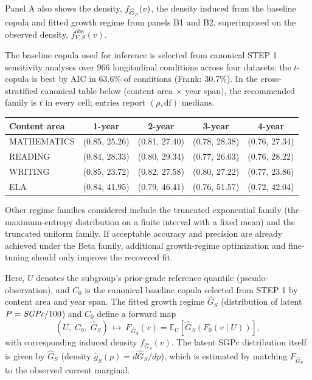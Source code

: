 \documentclass[10pt]{article}
\newlength{\fnlabelwidth}
\newcommand{\fnline}[2]{%
  \par\noindent
  \makebox[\fnlabelwidth][l]{$^{#1}$}%
  \parbox[t]{\dimexpr\linewidth-\fnlabelwidth\relax}{#2}%
  \par
}
\begin{document}
\vspace{0.60in}

\noindent
\hspace{0.5in}%
\begin{minipage}[t]{15.2in}
\small\raggedright
\setlength{\parskip}{0pt}

\fnline{1}{Panel A also shows the density, $f_{\widehat{G}_S}(v)$, the density induced from the baseline copula and fitted growth regime from panels B1 and B2, superimposed on the observed density, $f^{\mathrm{obs}}_{V,S}(v)$.}

\vspace{4pt}
\fnline{2}{The baseline copula used for inference is selected from canonical STEP 1 sensitivity analyses over 966 longitudinal conditions across four datasets: the $t$-copula is best by AIC in 63.6\% of conditions (Frank: 30.7\%). In the cross-stratified canonical table below (content area $\times$ year span), the recommended family is $t$ in every cell; entries report $(\rho,\mathrm{df})$ medians.
\vspace{2pt}
\begin{center}
\begin{tabular}{@{}lcccc@{}}
\textbf{Content area} & \textbf{1-year} & \textbf{2-year} & \textbf{3-year} & \textbf{4-year} \\
\hline
\noalign{\vspace{2pt}}
MATHEMATICS & (0.85, 25.26) & (0.81, 27.40) & (0.78, 28.38) & (0.76, 27.34) \\
READING     & (0.84, 28.33) & (0.80, 29.34) & (0.77, 26.63) & (0.76, 28.22) \\
WRITING     & (0.85, 23.72) & (0.82, 27.58) & (0.80, 27.22) & (0.77, 23.86) \\
ELA         & (0.84, 41.95) & (0.79, 46.41) & (0.76, 51.57) & (0.72, 42.04) \\
\end{tabular}
\end{center}}

\vspace{6pt}
\fnline{3}{Other regime families considered include the truncated exponential family (the maximum-entropy distribution on a finite interval with a fixed mean) and the truncated uniform family. If acceptable accuracy and precision are already achieved under the Beta family, additional growth-regime optimization and fine-tuning should only improve the recovered fit.}

\vspace{4pt}
\fnline{4}{Here, $U$ denotes the subgroup's prior-grade reference quantile (pseudo-observation), and $C_0$ is the canonical baseline copula selected from STEP 1 by content area and year span. The fitted growth regime $\widehat{G}_S$ (distribution of latent $P=\textit{SGPc}/100$) and $C_0$ define a forward map
\[
(U,\;C_0,\;\widehat{G}_S)\ \longmapsto\ F_{\widehat{G}_S}(v)=\mathbb{E}_U\!\left[\widehat{G}_S\!\left(F_0(v\mid U)\right)\right],
\]
with corresponding induced density $f_{\widehat{G}_S}(v)$. The latent SGPc distribution itself is given by $\widehat{G}_S$ (density $\widehat{g}_S(p)=d\widehat{G}_S/dp$), which is estimated by matching $F_{\widehat{G}_S}$ to the observed current marginal.}


\end{minipage}
\end{document}
